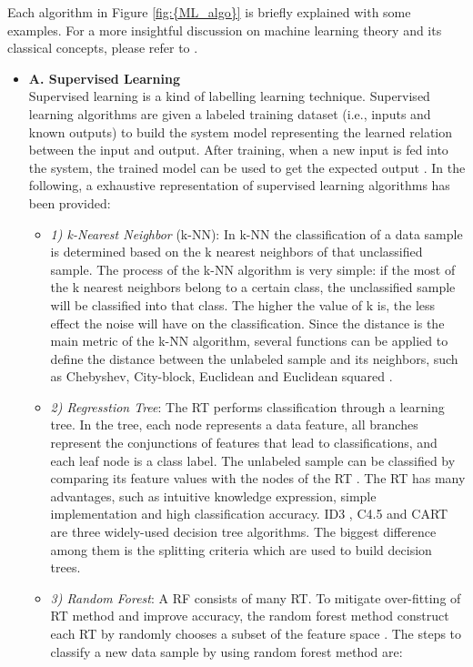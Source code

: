 Each algorithm in Figure \ref{fig:{ML_algo}} is briefly explained with some examples. For a more insightful discussion on machine learning theory and its classical concepts, please refer to \cite{Mohammed2016, Marsland2015, Alpaydin2020}.
\begin{itemize}
\item[]\textbf{A. Supervised Learning}\\
Supervised learning is a kind of labelling learning technique. Supervised learning algorithms are given a labeled training dataset (i.e., inputs and known outputs) to build the system model representing the learned relation between the input and output. After training, when a new input is fed into the system, the trained model can be used to get the expected output \cite{Kotsiantis2007, Hastie2009}. In the following, a exhaustive representation of supervised learning algorithms has been provided:
\begin{itemize}
\item[]\textit{1) k-Nearest Neighbor} (k-NN): In k-NN the classification of a data sample is determined based on the k nearest neighbors of that unclassified sample. The process of the k-NN algorithm is very simple: if the most of the k nearest neighbors belong to a certain class, the unclassified sample will be classified into that class. The higher the value of k is, the less effect the noise will have on the classification. Since the distance is the main metric of the k-NN algorithm, several functions can be applied to define the distance between the unlabeled sample and its neighbors, such as Chebyshev, City-block, Euclidean and Euclidean squared \cite{Cover1967}.
\item[]\textit{2) Regresstion Tree}: The RT performs classification through a learning tree. In the tree, each node represents a data feature, all branches represent the conjunctions of features that lead to classifications, and each leaf node is a class label. The unlabeled sample can be classified by comparing its feature values with the nodes of the RT \cite{Han2011}. The RT has many advantages, such as intuitive knowledge expression, simple implementation and high classification accuracy. ID3 \cite{Quinlan1986}, C4.5 \cite{Karatsiolis2012} and CART \cite{Burrows1995} are three widely-used decision tree algorithms. The biggest difference among them is the splitting criteria which are used to build decision trees. 
\item[]\textit{3) Random Forest}: A RF \cite{Breiman1999} consists of many RT. To mitigate over-fitting of RT method and improve accuracy, the random forest method construct each RT by randomly chooses a subset of the feature space . The steps to classify a new data sample by using random forest method are:

\end{itemize}
\end{itemize}

